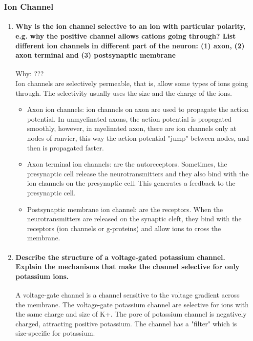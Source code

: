 \documentclass[12pt,article,oneside,a4paper]{memoir}
\begin{document}
\subsubsection{Ion Channel}
\begin{enumerate}
\item \paragraph{Why is the ion channel selective to an ion with particular polarity, e.g. why the positive channel allows cations going through? List different ion channels in different part of the neuron: (1) axon, (2) axon terminal and (3) postsynaptic membrane}

Why: ??? \\
Ion channels are selectively permeable, that is, allow some types of ions going through. The selectivity usually uses the size and the charge of the ions.

\begin{itemize}
\item Axon ion channels: ion channels on axon are used to propagate the action potential. In unmyelinated axons, the action potential is propagated smoothly, however, in myelinated axon, there are ion channels only at nodes of ranvier, this way the action potential "jump" between nodes, and then is propagated faster.
\item Axon terminal ion channels: are the autoreceptors. Sometimes, the presynaptic cell release the neurotransmitters and they also bind with the ion channels on the presynaptic cell. This generates a feedback to the presynaptic cell.
\item Postsynaptic membrane ion channel: are the receptors. When the neurotransmitters are released on the synaptic cleft, they bind with the receptors (ion channels or g-proteins) and allow ions to cross the membrane.
\end{itemize}

\item \paragraph{Describe the structure of a voltage-gated potassium channel. Explain the mechanisms that make the channel selective for only potassium ions.}
A voltage-gate channel is a channel sensitive to the voltage gradient across the membrane. The voltage-gate potassium channel are selective for ions with the same charge and size of K+. The pore of potassium channel is negatively charged, attracting positive potassium. The channel has a "filter" which is size-specific for potassium.


\end{enumerate}
\end{document}
